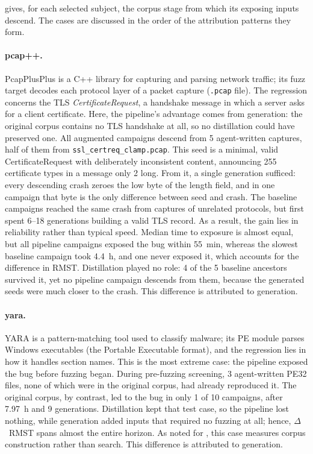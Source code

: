  gives, for each selected subject, the corpus stage from which its exposing inputs descend.
The cases are discussed in the order of the attribution patterns they form.

\paragraph{pcap++.}
PcapPlusPlus is a C++ library for capturing and parsing network traffic; its fuzz target decodes each protocol layer of a packet capture (\texttt{.pcap} file).
The regression concerns the TLS \emph{CertificateRequest}, a handshake message in which a server asks for a client certificate.
Here, the pipeline's advantage comes from generation: the original corpus contains no TLS handshake at all, so no distillation could have preserved one.
All augmented campaigns descend from \num{5} agent-written captures, half of them from \texttt{ssl\_certreq\_clamp.pcap}.
This seed is a minimal, valid CertificateRequest with deliberately inconsistent content, announcing \num{255} certificate types in a message only \SI{2}{\byte} long.
From it, a single generation sufficed: every descending crash zeroes the low byte of the length field, and in one campaign that byte is the only difference between seed and crash.
The baseline campaigns reached the same crash from captures of unrelated protocols, but first spent \numrange{6}{18} generations building a valid TLS record.
As a result, the gain lies in reliability rather than typical speed.
Median time to exposure is almost equal, but all pipeline campaigns exposed the bug within \SI{55}{\minute}, whereas the slowest baseline campaign took \SI{4.4}{\hour}, and one never exposed it, which accounts for the difference in \ac{RMST}.
Distillation played no role: \num{4} of the \num{5} baseline ancestors survived it, yet no pipeline campaign descends from them, because the generated seeds were much closer to the crash.
This difference is attributed to generation.

\paragraph{yara.}
YARA is a pattern-matching tool used to classify malware; its PE module parses Windows executables (the Portable Executable format), and the regression lies in how it handles section names.
This is the most extreme case: the pipeline exposed the bug before fuzzing began.
During pre-fuzzing screening, \num{3} agent-written PE32 files, none of which were in the original corpus, had already reproduced it.
The original corpus, by contrast, led to the bug in only \num{1} of \num{10} campaigns, after \SI{7.97}{\hour} and \num{9} generations.
Distillation kept that test case, so the pipeline lost nothing, while generation added inputs that required no fuzzing at all; hence, $\Delta$~\ac{RMST} spans almost the entire horizon.
As noted for , this case measures corpus construction rather than search.
This difference is attributed to generation.

